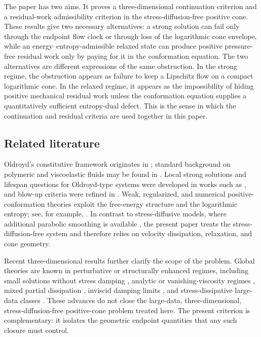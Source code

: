 \documentclass[10pt,a4paper]{amsart}
\numberwithin{equation}{section}
\begin{document}
The paper has two aims.  It proves a three-dimensional continuation criterion
and a residual-work admissibility criterion in the stress-diffusion-free
positive cone.  These results give two necessary alternatives: a strong solution
can fail only through the endpoint flow clock or through loss of the
logarithmic cone envelope, while an energy--entropy-admissible relaxed state can
produce positive pressure-free residual work only by paying for it in the
conformation equation.  The two alternatives are different expressions of the
same obstruction.  In the strong regime, the obstruction appears as failure to
keep a Lipschitz flow on a compact logarithmic cone.  In the relaxed regime, it
appears as the impossibility of hiding positive mechanical residual work unless
the conformation equation supplies a quantitatively sufficient entropy-dual
defect.  This is the sense in which the continuation and residual criteria are
used together in this paper.

\subsection*{Related literature}

Oldroyd's constitutive framework originates in \cite{Oldroyd}; standard
background on polymeric and viscoelastic fluids may be found in
\cite{Bird,Renardy,RenardyThomases}.  Local strong solutions and lifespan
questions for Oldroyd-type systems were developed in works such as
\cite{GuillopeSaut,CheminMasmoudi}, and blow-up criteria were refined in
\cite{LeiMasmoudiZhou}.  Weak, regularized, and numerical
positive-conformation theories exploit the free-energy structure and the
logarithmic entropy; see, for example, \cite{LionsMasmoudi,BarrettBoyaval}.
In contrast to stress-diffusive models, where additional parabolic smoothing is
available \cite{ConstantinKliegl,ElgindiRousset,HuangLiuZi}, the present paper
treats the stress-diffusion-free system and therefore relies on velocity
dissipation, relaxation, and cone geometry.

Recent three-dimensional results further clarify the scope of the problem.
Global theories are known in perturbative or structurally enhanced regimes,
including small solutions without stress damping \cite{Zhu2018}, analytic or
vanishing-viscosity regimes \cite{Zi2021}, mixed partial dissipation
\cite{LinWuBoardman}, inviscid damping limits \cite{ChengLuoYangYuan}, and
stress-dissipative large-data classes \cite{LiangLiZhai}.  These advances do
not close the large-data, three-dimensional, stress-diffusion-free positive-cone
problem treated here.  The present criterion is complementary: it isolates the
geometric endpoint quantities that any such closure must control.
\end{document}
